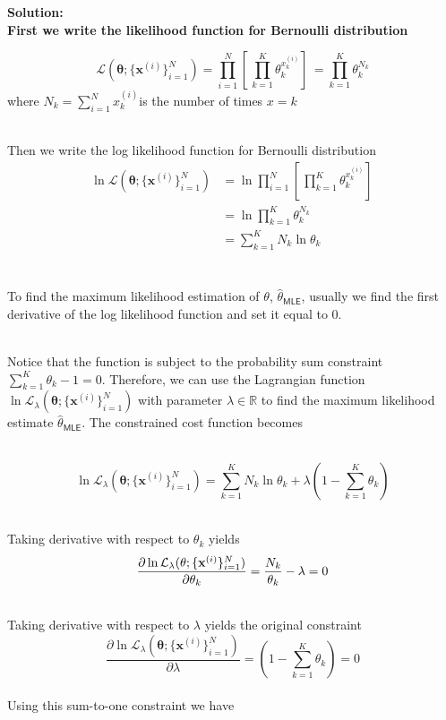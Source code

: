 \documentclass[11pt]{article}
\begin{document}
	{\noindent \bf Solution: 
	\ \\
	First we write the likelihood function for Bernoulli distribution

$$ \mathcal{L}(
	\mathbf{\theta}; \{ \mathbf{x}^{(i)}\}_{i = 1}^N ) = \prod\limits_{i=1}^N[ \, \prod\limits_{k = 1}^K \theta_k ^{x^{(i)}_k}]\,= \prod\limits_{k=1}^K \theta_k^{N_k}$$
    where $N_k = \sum\limits_{i=1}^N x^{(i)}_k $is the number of times $x=k$

\ \\
Then we write the log likelihood function for Bernoulli distribution
\begin{equation}
    \begin{split}
        \ln \mathcal{L}(
	\mathbf{\theta}; \{ \mathbf{x}^{(i)}\}_{i = 1}^N ) &= \ln \prod\limits_{i=1}^N[ \, \prod\limits_{k = 1}^K \theta_k ^{x^{(i)}_k}]\,\\
	&=\ln \prod\limits_{k=1}^K \theta_k^{N_k}\\
	&= \sum\limits_{k=1}^K N_k \ln \theta_k \\
    \end{split}
\end{equation}

\ \\
To find the maximum likelihood estimation of $\theta$,  $\hat{\theta}_{\mathsf{MLE}}$, usually we find the first derivative of the log likelihood function and set it equal to 0. 

\ \\
Notice that the function is subject to the probability sum constraint $\sum\limits_{k = 1}^K \theta_k - 1 = 0$. Therefore, we can use the Lagrangian function $\ln \mathcal{L}_{\lambda}(\mathbf{\theta}; \{ \mathbf{x}^{(i)}\}_{i = 1}^N)$ with parameter $\lambda \in \mathbb{R}$ to find the maximum likelihood estimate $\hat{\theta}_{\mathsf{MLE}}$. The constrained cost function becomes

\ \\
 $$\ln \mathcal{L}_{\lambda}(\mathbf{\theta}; \{ \mathbf{x}^{(i)}\}_{i = 1}^N) = 
	\sum\limits_{k=1}^K N_k \ln \theta_k
	+ 
	\lambda \left (1 - \sum\limits_{k = 1}^K \theta_k \right )$$

\ \\
Taking derivative with respect to $\theta_k$ yields
$$    \frac{\partial \ln \mathcal{L}_{\lambda}(\mathbf{\theta}; \{ \mathbf{x}^{(i)}\}_{i = 1}^N)}{\partial \theta_k}= \frac{N_k}{\theta_k}-\lambda=0\\$$

\ \\
Taking derivative with respect to $\lambda$ yields the original constraint
$$\frac{\partial \ln \mathcal{L}_{\lambda}(\mathbf{\theta}; \{\mathbf{x}^{(i)}\}_{i = 1}^N)}{\partial \lambda}= \left (1 - \sum\limits_{k = 1}^K \theta_k \right)= 0$$
\ \\
Using this sum-to-one constraint we have

}
\end{document}
